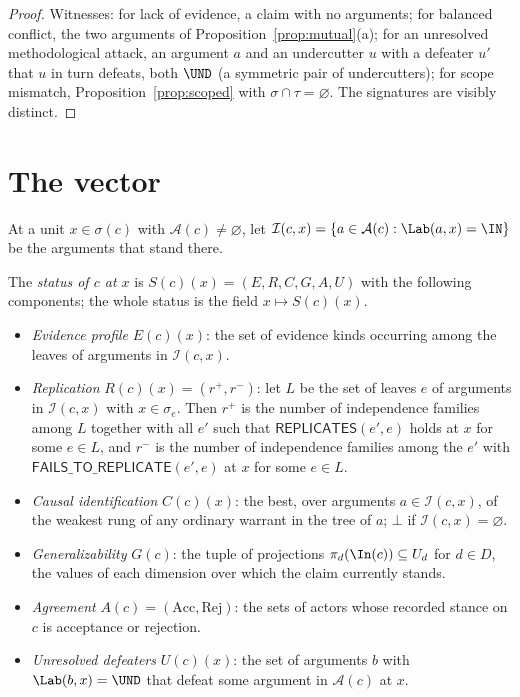 \begin{proof}
Witnesses: for lack of evidence, a claim with no arguments; for balanced conflict, the two arguments of Proposition~\ref{prop:mutual}(a); for an unresolved methodological attack, an argument $a$ and an undercutter $u$ with a defeater $u'$ that $u$ in turn defeats, both $\UND$ (a symmetric pair of undercutters); for scope mismatch, Proposition~\ref{prop:scoped} with $\sigma\cap\tau=\varnothing$. The signatures are visibly distinct.
\end{proof}

\section{The vector}

At a unit $x\in\sigma(c)$ with $\mathcal A(c)\ne\varnothing$, let $\mathcal I(c,x)=\{a\in\mathcal A(c):\Lab(a,x)=\IN\}$ be the arguments that stand there.

\begin{definition}\label{def:status}
The \emph{status of $c$ at $x$} is $S(c)(x)=(E,R,C,G,A,U)$ with the following components; the whole status is the field $x\mapsto S(c)(x)$.
\begin{itemize}
\item \emph{Evidence profile} $E(c)(x)$: the set of evidence kinds occurring among the leaves of arguments in $\mathcal I(c,x)$.
\item \emph{Replication} $R(c)(x)=(r^+,r^-)$: let $L$ be the set of leaves $e$ of arguments in $\mathcal I(c,x)$ with $x\in\sigma_e$. Then $r^+$ is the number of independence families among $L$ together with all $e'$ such that $\textsf{REPLICATES}(e',e)$ holds at $x$ for some $e\in L$, and $r^-$ is the number of independence families among the $e'$ with $\textsf{FAILS\_TO\_REPLICATE}(e',e)$ at $x$ for some $e\in L$.
\item \emph{Causal identification} $C(c)(x)$: the best, over arguments $a\in\mathcal I(c,x)$, of the weakest rung of any ordinary warrant in the tree of $a$; $\bot$ if $\mathcal I(c,x)=\varnothing$.
\item \emph{Generalizability} $G(c)$: the tuple of projections $\pi_d(\In(c))\subseteq U_d$ for $d\in D$, the values of each dimension over which the claim currently stands.
\item \emph{Agreement} $A(c)=(\mathrm{Acc},\mathrm{Rej})$: the sets of actors whose recorded stance on $c$ is acceptance or rejection.
\item \emph{Unresolved defeaters} $U(c)(x)$: the set of arguments $b$ with $\Lab(b,x)=\UND$ that defeat some argument in $\mathcal A(c)$ at $x$.
\end{itemize}
\end{definition}

